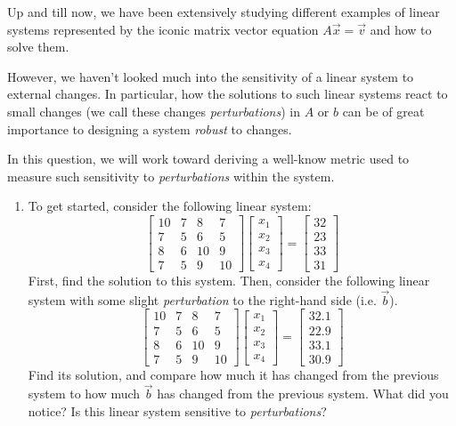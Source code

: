 
Up and till now, we have been extensively studying different examples of linear systems represented by the iconic matrix vector equation $A\vec{x} = \vec{v}$ and how to solve them.

However, we haven't looked much into the sensitivity of a linear system to external changes. In particular, how the solutions to such linear systems react to small changes (we call these changes \textit{perturbations}) in $A$ or $b$ can be of great importance to designing a system \textit{robust} to changes.

In this question, we will work toward deriving a well-know metric used to measure such sensitivity to \textit{perturbations} within the system.

\begin{enumerate}
    \item To get started, consider the following linear system:
    $$
    \begin{bmatrix}
        10 & 7 & 8 & 7 \\
        7 & 5 & 6 & 5 \\
        8 & 6 & 10 & 9 \\
        7 & 5 & 9 & 10
    \end{bmatrix}\begin{bmatrix}
        x_{1} \\
        x_{2} \\
        x_{3} \\
        x_{4}
        \end{bmatrix}=\begin{bmatrix}
        32 \\
        23 \\
        33 \\
        31
        \end{bmatrix}
    $$
    First, find the solution to this system. Then, consider the following linear system with some slight \textit{perturbation} to the right-hand side (i.e. $\vec{b}$).
    $$
    \begin{bmatrix}
        10 & 7 & 8 & 7 \\
        7 & 5 & 6 & 5 \\
        8 & 6 & 10 & 9 \\
        7 & 5 & 9 & 10
    \end{bmatrix}\begin{bmatrix}
        x_{1} \\
        x_{2} \\
        x_{3} \\
        x_{4}
        \end{bmatrix}=\begin{bmatrix}
        32.1 \\
        22.9 \\
        33.1 \\
        30.9
        \end{bmatrix}
    $$
    Find its solution, and compare how much it has changed from the previous system to how much $\vec{b}$ has changed from the previous system. What did you notice? Is this linear system sensitive to \textit{perturbations}?


\end{enumerate}
